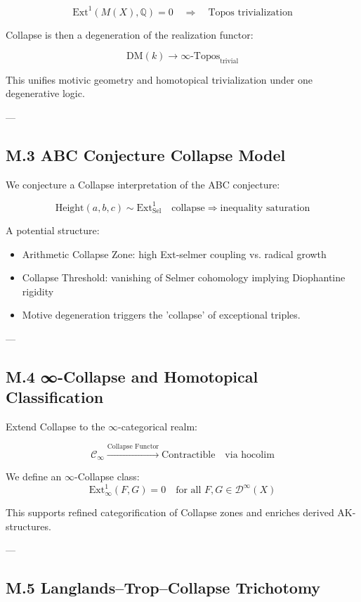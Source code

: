 \documentclass[11pt]{article}
\begin{document}
\begin{axiom}
\begin{axiom}
{{\[
\mathrm{Ext}^1(M(X), \mathbb{Q}) = 0 \quad \Rightarrow \quad \text{Topos trivialization}
\]

Collapse is then a degeneration of the realization functor:

\[
\mathrm{DM}(k) \to \infty\text{-Topos}_{\text{trivial}}
\]

This unifies motivic geometry and homotopical trivialization under one degenerative logic.

---

\subsection*{M.3 ABC Conjecture Collapse Model}

We conjecture a Collapse interpretation of the ABC conjecture:

\[
\text{Height}(a,b,c) \sim \mathrm{Ext}^1_{\mathrm{Sel}} \quad \text{collapse} \Rightarrow \text{inequality saturation}
\]

A potential structure:

\begin{itemize}
  \item Arithmetic Collapse Zone: high Ext-selmer coupling vs. radical growth
  \item Collapse Threshold: vanishing of Selmer cohomology implying Diophantine rigidity
  \item Motive degeneration triggers the 'collapse' of exceptional triples.
\end{itemize}

---

\subsection*{M.4 ∞-Collapse and Homotopical Classification}

Extend Collapse to the $\infty$-categorical realm:

\[
\mathcal{C}_\infty \xrightarrow{\text{Collapse Functor}} \text{Contractible} \quad \text{via }\mathrm{hocolim}
\]

We define an $\infty$-Collapse class:
\[
\mathrm{Ext}^1_\infty(F,G) = 0 \quad \text{for all } F,G \in \mathcal{D}^\infty(X)
\]

This supports refined categorification of Collapse zones and enriches derived AK-structures.

---

\subsection*{M.5 Langlands–Trop–Collapse Trichotomy}

}}
\end{axiom}
\end{axiom}
\end{document}
